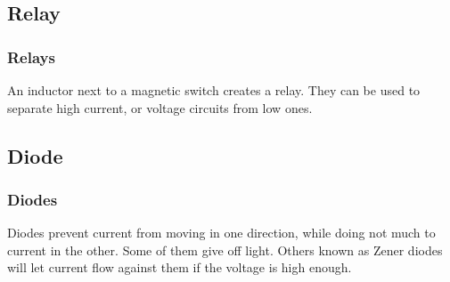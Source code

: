 \documentclass[10pt, handout]{beamer}
\begin{document}
\subsection{Relay}

\begin{frame}
\frametitle{Relays}
An inductor next to a magnetic switch creates a relay. They can be used to separate high current, or voltage circuits from low ones.
\end{frame}

\subsection{Diode}

\begin{frame}
\frametitle{Diodes}
Diodes prevent current from moving in one direction, while doing not much to current in the other. Some of them give off light. Others known as Zener diodes will let current flow against them if the voltage is high enough.\\
\begin{center}

\end{center}
\end{frame}
\end{document}
